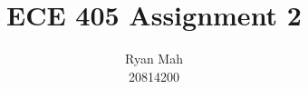 \documentclass[12pt]{article}
\begin{document}
\title{ECE 405 Assignment 2}
\author{Ryan Mah \\ 20814200}
\date{\vspace{-2ex}}
\maketitle


\end{document}
